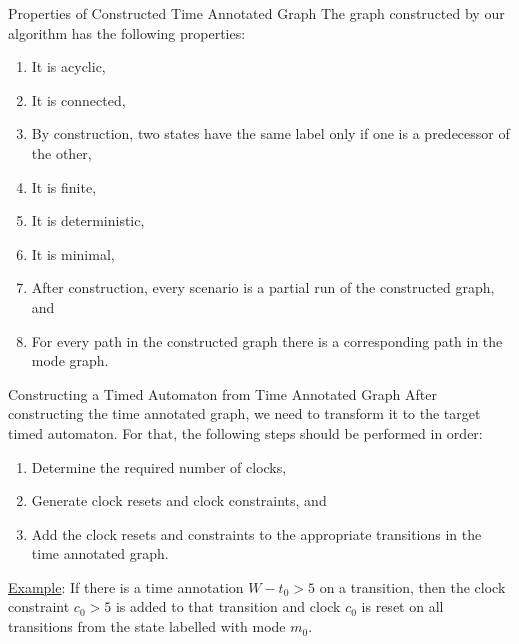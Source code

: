 \documentclass[10pt]{beamer}
\theoremstyle{plain}
\theoremstyle{definition}
\begin{document}
\begin{frame}{Properties of Constructed Time Annotated Graph}
The graph constructed by our algorithm has the following properties:
	\begin{enumerate}
		\item
		It is acyclic,%
		\item
		It is connected,%
		\item\label{p3}
		By construction, two states have the same label only if one is a predecessor of the other, %
		\item\label{p4} It is finite,
		\item
		It is deterministic,%
		\item
		It is minimal, %
		\item
		After construction, every scenario is a partial run of the constructed graph, and
		\item
		For every path in the constructed graph there is a corresponding path in the mode graph. %
	\end{enumerate}

\end{frame}


\begin{frame}{Constructing a Timed Automaton from Time Annotated Graph}
	After constructing the time annotated graph, we need to transform it to the target timed automaton. For that, the following steps should be performed in order:
	\begin{enumerate}	
		\item Determine the required number of clocks,
		\item Generate clock resets and clock constraints, and
		\item Add the clock resets and constraints to the appropriate transitions in the time annotated graph. %
	\end{enumerate}
	\underline{Example}: If there is a time annotation $W-t_0 > 5$ on a transition, then the clock constraint $c_0 > 5$ is added to that transition and clock $c_0$ is reset on all transitions from the state labelled with mode $m_0$.
\end{frame}
\end{document}
